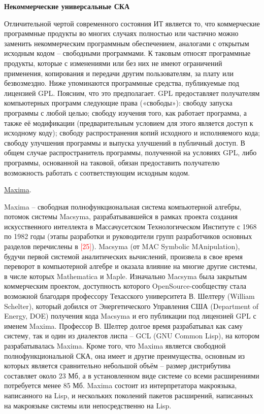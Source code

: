 \textbf{Некоммерческие универсальные СКА}

Отличительной чертой современного состояния ИТ является то, что коммерческие программные продукты во многих случаях полностью или частично можно заменить некоммерческим программным обеспечением, аналогами с открытым исходным кодом – свободными программами. К таковым относят программные продукты, которые с изменениями или без них не имеют ограничений применения, копирования и передачи другим пользователям, за плату или безвозмездно. Ниже упоминаются программные средства, публикуемые под лицензией GPL. Поясним, что это предполагает. GPL предоставляет получателям компьютерных программ следующие права («свободы»): свободу запуска программы с любой целью; свободу изучения того, как работает программа, а также её модификации (предварительным условием для этого является доступ к исходному коду); свободу распространения копий исходного и исполняемого кода; свободу улучшения программы и выпуска улучшений в публичный доступ. В общем случае распространитель программы, полученной на условиях GPL, либо программы, основанной на таковой, обязан предоставить получателю возможность работать с соответствующим исходным кодом.

\underline{Maxima}.

Maxima – свободная полнофункциональная система компьютерной алгебры, потомок системы Macsyma, разрабатывавшейся в рамках проекта создания искусственного интеллекта в Массачусетском Технологическом Институте с 1968 по 1982 годы (этапы разработки и руководители групп разработчиков основных разделов перечислены в \textcolor{red}{[25]}). Macsyma (от MAC Symbolic MAnipulation), будучи первой системой аналитических вычислений, произвела в свое время переворот в компьютерной алгебре и оказала влияние на многие другие системы, в числе которых Mathematica и Maple. Изначально Macsyma была закрытым коммерческим проектом, доступность которого OpenSource-сообществу стала возможной благодаря профессору Техасского университета В. Шелтеру (William Schelter), который добился от Энергетического Управления США (Department of Energy, DOE) получения кода Macsyma и его публикации под лицензией GPL с именем Maxima. Профессор В. Шелтер долгое время разрабатывал как саму систему, так и один из диалектов лиспа – GCL (GNU Common Lisp), на котором разрабатывалась Maxima.
Кроме того, что Maxima является свободной полнофункциональной СКА, она имеет и другие преимущества, основным из которых является сравнительно небольшой объём – размер дистрибутива составляет около 23 Мб, а в установленном виде системе со всеми расширениями потребуется менее 85 Мб. Maxima состоит из интерпретатора макроязыка, написанного на Lisp, и нескольких поколений пакетов расширений, написанных на макроязыке системы или непосредственно на Lisp.

